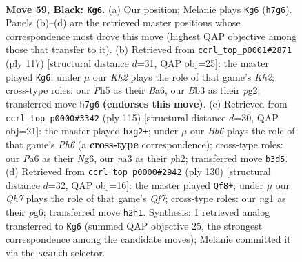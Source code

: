 \documentclass[11pt]{article}
\begin{document}
\clearpage

\begin{figure}[p]\centering
\begin{subfigure}{0.46\textwidth}\centering
\resizebox{\linewidth}{!}{%
\newchessgame
\chessboard[
  setfen={8/7k/p1Q1P3/3P3p/6p1/Nb6/5P1q/5KN1 b - - 2 59},
  showmover=false,
  pgfstyle=straightmove, color=movearrow, markmove={h7-g6}
]}
\caption{}
\end{subfigure}\hfill
\begin{subfigure}{0.46\textwidth}\centering
\resizebox{\linewidth}{!}{%
\newchessgame
\chessboard[
  setfen={8/p6k/b4q2/2Q2N1p/3P4/7P/6P1/6K1 b - - 2 59},
  showmover=false,
  pgfstyle=straightmove, color=movearrow, markmove={h7-g6}
]}
\caption{}
\end{subfigure}
\\[4pt]
\begin{subfigure}{0.46\textwidth}\centering
\resizebox{\linewidth}{!}{%
\newchessgame
\chessboard[
  setfen={8/3P4/6n1/p7/8/5Q1p/1k1qN1PP/7K b - - 0 58},
  showmover=false,
  pgfstyle=straightmove, color=movearrow, markmove={h3-g2}
]}
\caption{}
\end{subfigure}\hfill
\begin{subfigure}{0.46\textwidth}\centering
\resizebox{\linewidth}{!}{%
\newchessgame
\chessboard[
  setfen={7k/5Q2/1q4pp/2p2p2/4n3/1P5P/6PK/4B3 w - - 5 66},
  showmover=false,
  pgfstyle=straightmove, color=movearrow, markmove={f7-f8}
]}
\caption{}
\end{subfigure}
\caption{\textbf{Move 59, Black: \texttt{Kg6}.} (a) Our position; Melanie plays \texttt{Kg6} (\texttt{h7g6}). Panels (b)--(d) are the retrieved master positions whose correspondence most drove this move (highest QAP objective among those that transfer to it). (b) Retrieved from \texttt{ccrl\_top\_p0001\#2871} (ply 117) [structural distance $d$=31, QAP obj=25]: the master played \texttt{Kg6}; under $\mu$ our \emph{Kh2} plays the role of that game's \emph{Kh2}; cross-type roles: our \emph{P}h5 as their \emph{B}a6, our \emph{B}b3 as their \emph{p}g2; transferred move \texttt{h7g6} \textbf{(endorses this move)}. (c) Retrieved from \texttt{ccrl\_top\_p0000\#3342} (ply 115) [structural distance $d$=30, QAP obj=21]: the master played \texttt{hxg2+}; under $\mu$ our \emph{Bb6} plays the role of that game's \emph{Ph6} (a \textbf{cross-type} correspondence); cross-type roles: our \emph{P}a6 as their \emph{N}g6, our \emph{n}a3 as their \emph{p}h2; transferred move \texttt{b3d5}. (d) Retrieved from \texttt{ccrl\_top\_p0000\#2942} (ply 130) [structural distance $d$=32, QAP obj=16]: the master played \texttt{Qf8+}; under $\mu$ our \emph{Qh7} plays the role of that game's \emph{Qf7}; cross-type roles: our \emph{n}g1 as their \emph{p}g6; transferred move \texttt{h2h1}. Synthesis: 1 retrieved analog transferred to \texttt{Kg6} (summed QAP objective 25, the strongest correspondence among the candidate moves); Melanie committed it via the \texttt{search} selector.}
\label{fig:thought-m117}
\end{figure}
\end{document}

